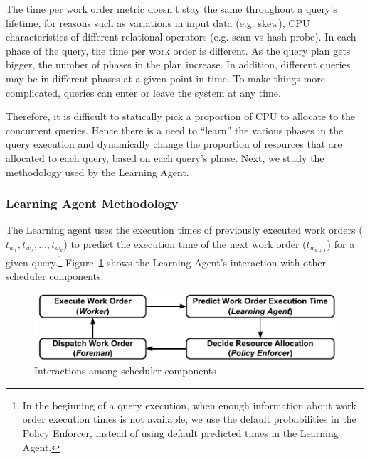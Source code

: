 The time per work order metric doesn't stay the same throughout a query's lifetime, for reasons such as variations in input data (e.g. skew), CPU characteristics of different relational operators (e.g. scan vs hash probe).
In each phase of the query, the time per work order is different.
As the query plan gets bigger, the number of phases in the plan increase.
In addition, different queries may be in different phases at a given point in time.
To make things more complicated, queries can enter or leave the system at any time.

Therefore, it is difficult to statically pick a proportion of CPU to allocate to the concurrent queries. 
Hence there is a need to ``learn'' the various phases in the query execution and dynamically change the proportion of resources that are allocated to each query, based on each query's phase.
Next, we study the methodology used by the Learning Agent.
\subsubsection{Learning Agent Methodology}
The Learning agent uses the execution times of previously executed work orders 
($t_{w_{1}}, t_{w_{2}}, \ldots, t_{w_{k}}$) to predict the execution time of 
the next work order ($t_{w_{k+1}}$) for a given query.\footnote{In the beginning of a query execution, when enough information about work order execution times is not available, we use the default probabilities in the Policy Enforcer, instead of using default predicted times in the Learning Agent.}
Figure~\ref{fig:scheduler-cycle} shows the Learning Agent's interaction with other scheduler components.

\begin{figure}[]
	\centering
	\includegraphics[width=\linewidth]{figures/Compact-SchedulerCycle.pdf}
	\vspace{-1.5em}
	\caption{Interactions among scheduler components}
	\label{fig:scheduler-cycle}
	\vspace{-1.5em}
\end{figure}

